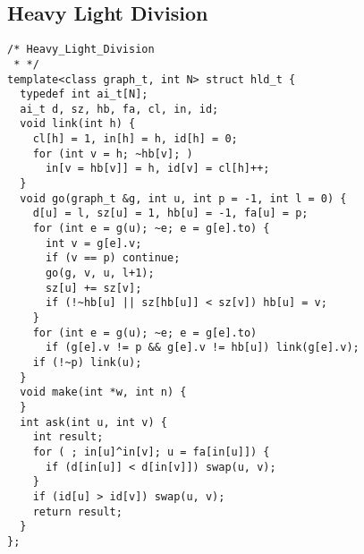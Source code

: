 \subsection{Heavy Light Division}
\begin{lstlisting}
/* Heavy_Light_Division
 * */
template<class graph_t, int N> struct hld_t {
  typedef int ai_t[N];
  ai_t d, sz, hb, fa, cl, in, id;
  void link(int h) {
    cl[h] = 1, in[h] = h, id[h] = 0;
    for (int v = h; ~hb[v]; )
      in[v = hb[v]] = h, id[v] = cl[h]++;
  }
  void go(graph_t &g, int u, int p = -1, int l = 0) {
    d[u] = l, sz[u] = 1, hb[u] = -1, fa[u] = p;
    for (int e = g(u); ~e; e = g[e].to) {
      int v = g[e].v;
      if (v == p) continue;
      go(g, v, u, l+1);
      sz[u] += sz[v];
      if (!~hb[u] || sz[hb[u]] < sz[v]) hb[u] = v;
    }
    for (int e = g(u); ~e; e = g[e].to)
      if (g[e].v != p && g[e].v != hb[u]) link(g[e].v);
    if (!~p) link(u);
  }
  void make(int *w, int n) {
  }
  int ask(int u, int v) {
    int result;
    for ( ; in[u]^in[v]; u = fa[in[u]]) {
      if (d[in[u]] < d[in[v]]) swap(u, v);
    }
    if (id[u] > id[v]) swap(u, v);
    return result;
  }
};
\end{lstlisting}


